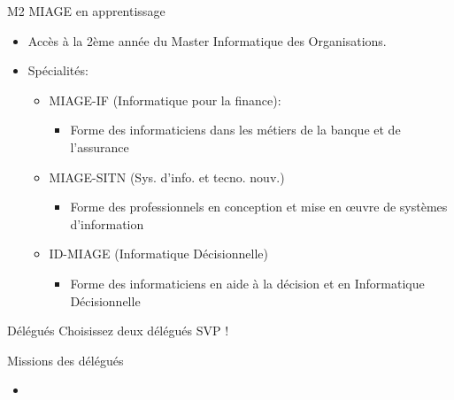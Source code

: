\documentclass[minimal,compress]{beamer}
\begin{document}
\begin{frame}{M2 MIAGE en apprentissage}

\begin{itemize}
\item Accès à la \alert{2ème année} du Master Informatique des Organisations.
\item Spécialités:
\begin{itemize}
\item \alert{MIAGE-IF} (Informatique pour la finance):
\begin{itemize}
\item Forme des informaticiens dans les métiers de la \alert{banque et de l’assurance}
\end{itemize}
\item \alert{MIAGE-SITN} (Sys. d’info. et tecno. nouv.)
\begin{itemize}
\item Forme des professionnels en conception et mise en œuvre de \alert{systèmes d’information}
\end{itemize}
\item \alert{ID-MIAGE} (Informatique Décisionnelle)
\begin{itemize}
\item Forme des informaticiens en \alert{aide à la décision et en Informatique Décisionnelle}
\end{itemize}
\end{itemize}
\end{itemize}

\end{frame}

\begin{frame}{Délégués}
	Choisissez deux délégués SVP !
	\begin{block}{Missions des délégués}
		\begin{itemize}
			\item
		\end{itemize}
	\end{block}
\end{frame}
\end{document}
